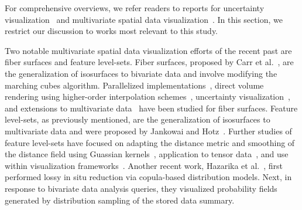 %
For comprehensive overviews, we refer readers to reports for uncertainty visualization~\cite{Bonneau2014,johnson2003next,potter2011quantification} and multivariate spatial data visualization~\cite{he2019multivariate}.
%
In this section, we restrict our discussion to works most relevant to this study.

Two notable multivariate spatial data visualization efforts of the recent past are fiber surfaces and feature level-sets.
%
Fiber surfaces, proposed by Carr et al.~\cite{carr2015fiber}, are the generalization of isosurfaces to bivariate data and involve modifying the marching cubes algorithm.
%
Parallelized implementations~\cite{klacansky2016fast}, direct volume rendering using higher-order interpolation schemes~\cite{wu2016direct}, uncertainty visualization~\cite{zheng2021uncertainty}, and extensions to multivariate data~\cite{blecha2020fiber} have been studied for fiber surfaces.  
%
Feature level-sets, as previously mentioned, are the generalization of isosurfaces to multivariate data and were proposed by Jankowai and Hotz~\cite{jankowai2020feature}.
%
Further studies of feature level-sets have focused on adapting the distance metric and smoothing of the distance field using Guassian kernels~\cite{nguyen2020visualization}, application to tensor data~\cite{jankowai2020tensor}, and use within visualization frameworks~\cite{jonsson2020inviwo}.
%
%
Another recent work, Hazarika et al.~\cite{hazarika2018codda}, first performed lossy in situ reduction via copula-based distribution models. 
%
Next, in response to bivariate data analysis queries, they visualized probability fields generated by distribution sampling of the stored data summary. 
%

%


